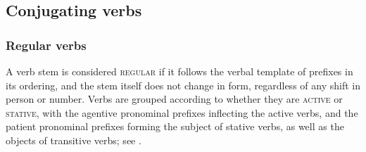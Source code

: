 \documentclass[output=paper]{LSP/langsci}
\begin{document}
\subsection{Conjugating verbs}
\subsubsection{Regular verbs}  A verb stem is considered \textsc{regular} if it follows the verbal template of prefixes in its ordering, and the stem itself does not change in form, regardless of any shift in person or number.  Verbs are grouped according to whether they are \textsc{active} or \textsc{stative}, with the agentive pronominal prefixes inflecting the active verbs, and the patient pronominal prefixes forming the subject of stative verbs, as well as the objects of transitive verbs; see . 
\end{document}
